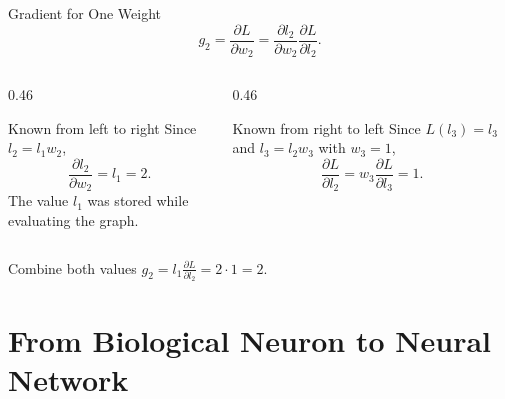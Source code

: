 \documentclass[aspectratio=169]{beamer}
\begin{document}
\begin{frame}{Gradient for One Weight}
  \small
  \begin{equation*}
    g_2
    = \frac{\partial L}{\partial w_2}
    = \frac{\partial l_2}{\partial w_2}
    \frac{\partial L}{\partial l_2}.
  \end{equation*}

  \begin{columns}[T]
    \begin{column}{0.46\textwidth}
      \begin{block}{Known from left to right}
        Since $l_2=l_1w_2$,
        \begin{equation*}
          \frac{\partial l_2}{\partial w_2}=l_1=2.
        \end{equation*}
        The value $l_1$ was stored while evaluating the graph.
      \end{block}
    \end{column}
    \begin{column}{0.46\textwidth}
      \begin{block}{Known from right to left}
        Since $L(l_3)=l_3$ and $l_3=l_2w_3$ with $w_3=1$,
        \begin{equation*}
          \frac{\partial L}{\partial l_2}
          =w_3\frac{\partial L}{\partial l_3}=1.
        \end{equation*}
      \end{block}
    \end{column}
  \end{columns}

  \begin{alertblock}{Combine both values}
    \centering
    $g_2=l_1\frac{\partial L}{\partial l_2}=2\cdot1=2.$
  \end{alertblock}
\end{frame}

\section{From Biological Neuron to Neural Network}
\end{document}
